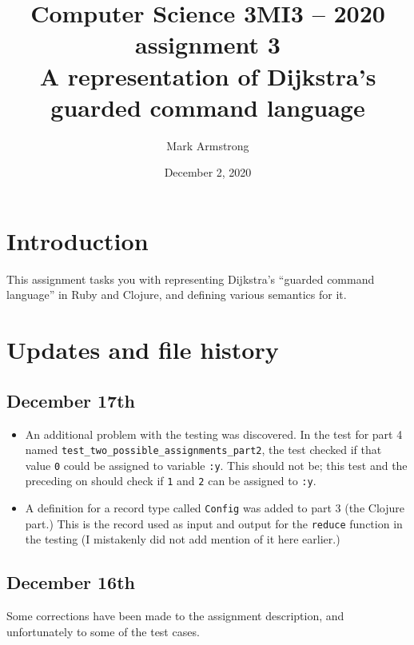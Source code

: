 \documentclass[11pt]{article}
\author{Mark Armstrong}
\date{December 2, 2020}
\title{Computer Science 3MI3 – 2020 assignment 3\\\medskip
\large A representation of Dijkstra's guarded command language}
\theoremstyle{definition}
\begin{document}
\maketitle
\tableofcontents


\section*{Introduction}
\label{sec:org5f54182}
This assignment tasks you with representing
Dijkstra's “guarded command language” in
Ruby and Clojure,
and defining various semantics for it.

\section*{Updates and file history}
\label{sec:org1cf36da}
\subsection*{December 17th}
\label{sec:orge97e79f}
\begin{itemize}
\item An additional problem with the testing was discovered.
In the test for part 4 named \texttt{test\_two\_possible\_assignments\_part2},
the test checked if that value \texttt{0} could be assigned to variable \texttt{:y}.
This should not be; this test and the preceding on should check
if \texttt{1} and \texttt{2} can be assigned to \texttt{:y}.

\item A definition for a record type called \texttt{Config} was added
to part 3 (the Clojure part.)
This is the record used as input and output for the \texttt{reduce} function
in the testing (I mistakenly did not add mention of it here earlier.)
\end{itemize}

\subsection*{December 16th}
\label{sec:org690bbeb}
Some corrections have been made to the assignment description,
and unfortunately to some of the test cases.
\end{document}
